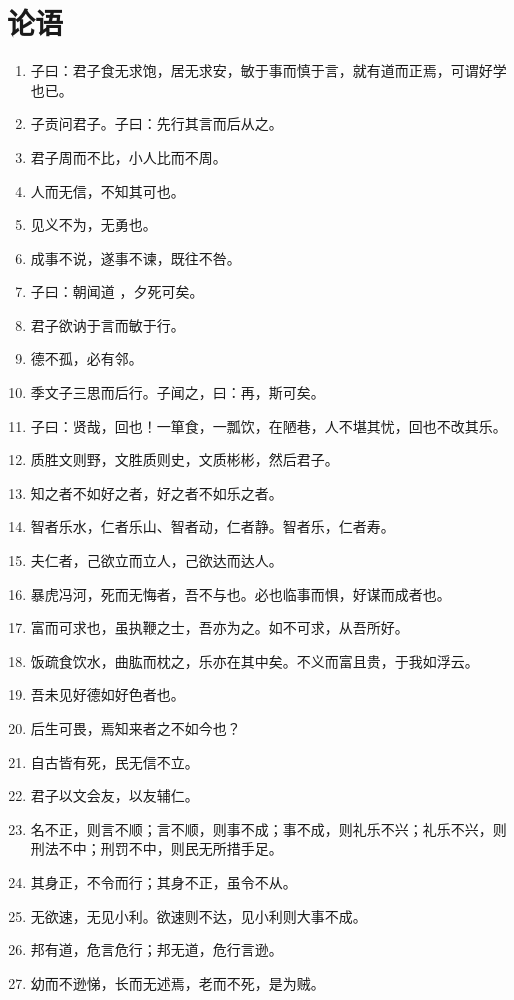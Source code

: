 \documentclass[UTF8]{ctexart}
\begin{document}
	\section{论语}
		\begin{enumerate}
			\item 子曰：君子食无求饱，居无求安，敏于事而慎于言，就有道而正焉，可谓好学也已。
			\item  子贡问君子。子曰：先行其言而后从之。
			\item 君子周而不比，小人比而不周。
			\item  人而无信，不知其可也。
			\item 见义不为，无勇也。
			\item 成事不说，遂事不谏，既往不咎。
			\item 子曰：朝闻道 ，夕死可矣。
			\item  君子欲讷于言而敏于行。
			\item 德不孤，必有邻。
			\item 季文子三思而后行。子闻之，曰：再，斯可矣。
			\item 子曰：贤哉，回也！一箪食，一瓢饮，在陋巷，人不堪其忧，回也不改其乐。
			\item 质胜文则野，文胜质则史，文质彬彬，然后君子。
			\item 知之者不如好之者，好之者不如乐之者。
			\item 智者乐水，仁者乐山、智者动，仁者静。智者乐，仁者寿。
			\item 夫仁者，己欲立而立人，己欲达而达人。
			\item 暴虎冯河，死而无悔者，吾不与也。必也临事而惧，好谋而成者也。
			\item 富而可求也，虽执鞭之士，吾亦为之。如不可求，从吾所好。
			\item 饭疏食饮水，曲肱而枕之，乐亦在其中矣。不义而富且贵，于我如浮云。
			\item 吾未见好德如好色者也。
			\item 后生可畏，焉知来者之不如今也？
			\item 自古皆有死，民无信不立。
			\item 君子以文会友，以友辅仁。
			\item 名不正，则言不顺；言不顺，则事不成；事不成，则礼乐不兴；礼乐不兴，则刑法不中；刑罚不中，则民无所措手足。
			\item 其身正，不令而行；其身不正，虽令不从。
			\item 无欲速，无见小利。欲速则不达，见小利则大事不成。
			\item 邦有道，危言危行；邦无道，危行言逊。
			\item 幼而不逊悌，长而无述焉，老而不死，是为贼。

\end{enumerate}
\end{document}
